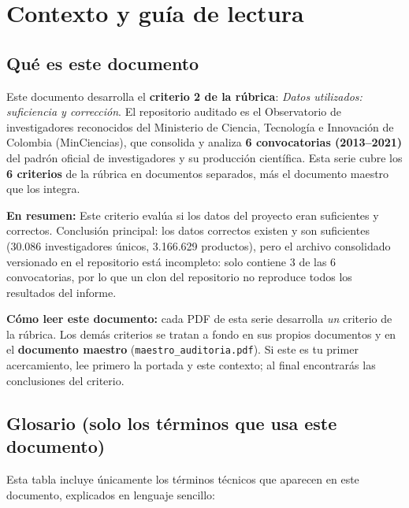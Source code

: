 \section{Contexto y guía de lectura}

\subsection{Qué es este documento}

Este documento desarrolla el \textbf{criterio 2 de la rúbrica}:
\emph{Datos utilizados: suficiencia y corrección}. El repositorio auditado es el
Observatorio de investigadores reconocidos del Ministerio de Ciencia,
Tecnología e Innovación de Colombia (MinCiencias), que consolida y analiza
\textbf{6 convocatorias (2013--2021)} del padrón oficial de investigadores
y su producción científica. Esta serie cubre los \textbf{6 criterios} de la
rúbrica en documentos separados, más el documento maestro que los integra.

\textbf{En resumen:} Este criterio evalúa si los datos del proyecto eran suficientes y correctos. Conclusión principal: los datos correctos existen y son suficientes (30.086 investigadores únicos, 3.166.629 productos), pero el archivo consolidado versionado en el repositorio está incompleto: solo contiene 3 de las 6 convocatorias, por lo que un clon del repositorio no reproduce todos los resultados del informe.




\begin{tcolorbox}[nota]
\textbf{Cómo leer este documento:} cada PDF de esta serie desarrolla \emph{un}
criterio de la rúbrica. Los demás criterios se tratan a fondo en sus propios
documentos y en el \textbf{documento maestro} (\texttt{maestro\_auditoria.pdf}).
Si este es tu primer acercamiento, lee primero la portada y este contexto; al
final encontrarás las conclusiones del criterio.
\end{tcolorbox}

\subsection{Glosario (solo los términos que usa este documento)}

Esta tabla incluye únicamente los términos técnicos que aparecen en este
documento, explicados en lenguaje sencillo:

